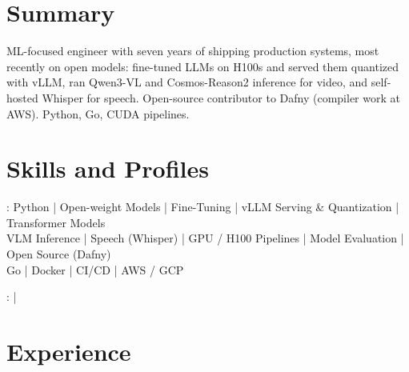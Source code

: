 \documentclass[print]{jack-resume}
\begin{document}
\pagecolor{darkmodeBackground}


\begin{minipage}[t][1cm][t]{.03\textwidth}
    \hfill
\end{minipage}

\section{Summary}
ML-focused engineer with seven years of shipping production systems, most recently on open models: fine-tuned LLMs on H100s and served them quantized with vLLM, ran Qwen3-VL and Cosmos-Reason2 inference for video, and self-hosted Whisper for speech. Open-source contributor to Dafny (compiler work at AWS). Python, Go, CUDA pipelines.
\sectionsep

\section{Skills and Profiles}
:
Python \hfill | \hfill
Open-weight Models \hfill | \hfill
Fine-Tuning \hfill | \hfill
vLLM Serving \& Quantization \hfill | \hfill
Transformer Models \\
\hspace{1.0cm} VLM Inference \hfill | \hfill
Speech (Whisper) \hfill | \hfill
GPU / H100 Pipelines \hfill | \hfill
Model Evaluation \hfill | \hfill
Open Source (Dafny) \\
\hspace{1.0cm} Go \hfill | \hfill
Docker \hfill | \hfill
CI/CD \hfill | \hfill
AWS / GCP \\

\raggedright{
    :
      \href{https://www.linkedin.com/in/jack-sturtevant/}{ \ExternalLink} |
     \href{https://github.com/jacksturt}{ \ExternalLink}}

\section{Experience}
\end{document}
